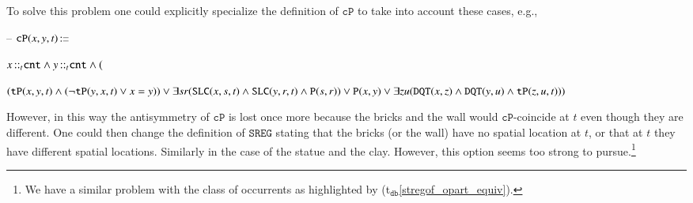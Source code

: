 \documentclass[ao]{iosart2x}
\newcommand{\bflist}{\begin{list}{}{\setlength{\topsep}{2mm}\setlength{\parsep}{0mm}\setlength{\leftmargin}{9.2mm}\setlength{\labelwidth}{8mm}}}
\newcommand{\eflist}{\end{list}}
\newcommand{\dbThrLabel}{\textrm{t$_\texttt{db}$}}
\newcommand{\refdbth}[1]{({\dbThrLabel}\ref{#1})}
\newcommand{\pr}[1]{\mathtt{#1}}
\newcommand{\cn}[1]{\mathtt{#1}}
\newcommand\textequal{%
 \rule[.08ex]{5pt}{0.35pt}\llap{\rule[.78ex]{5pt}{0.35pt}}}
\newcommand{\sdef}{{\hspace{1.5pt}:\hspace{-2.5pt}\textequal\hspace{3pt}}}
\newcommand {\TPd} {\ensuremath{\pr{tP}}}
\newcommand {\Pd} {\ensuremath{\pr{P}}}
\newcommand {\DQTd} {\ensuremath{\pr{DQT}}}
\newcommand {\SLCd} {\ensuremath{\pr{SLC}}}
\newcommand{\cntbcat}{\cn{cnt}}
\newcommand{\bfocpart}{\pr{cP}}
\newcommand{\bfoiof}[1]{{\,::_{#1\:\!}}}
\newcommand{\bfosregof}{\pr{SREG}}
\begin{document}
To solve this problem one could explicitly specialize the definition of $\bfocpart$ to take into account these cases, e.g.,  
\bflist
\item[--] $\bfocpart(x,y,t) \sdef $\parbox[t]{\textwidth} {$x \bfoiof{t} \cntbcat \land y \bfoiof{t} \cntbcat \land \\
($\parbox[t]{\textwidth} {$(\TPd(x,y,t) \land (\neg \TPd(y,x,t) \lor x=y)) \lor \\ 
\exists sr(\SLCd(x,s,t) \land \SLCd(y,r,t) \land \Pd(s,r)) \lor \\ 
\Pd(x,y) \lor \exists zu(\DQTd(x,z) \land \DQTd(y,u) \land \TPd(z,u,t)))$}}
\eflist
However, in this way the antisymmetry of $\bfocpart$ is lost once more because the bricks and the wall would $\bfocpart$-coincide at $t$ even though they are different. One could then change the definition of $\bfosregof$ stating that the bricks (or the wall) have no spatial location at $t$, or that at $t$ they have different spatial locations. Similarly in the case of the statue and the clay. However, this option seems too strong to pursue.\footnote{We have a similar problem with the class of occurrents as highlighted by \refdbth{stregof_opart_equiv}.}
\end{document}
